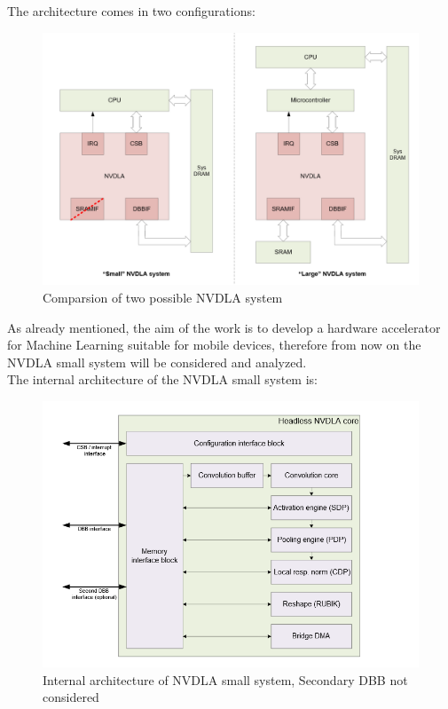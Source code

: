 The architecture comes in two configurations:

\begin{figure}[!htbp]
\centering
\captionsetup{justification=centering}
\includegraphics[scale=0.4]{./figure/nvdla_system.PNG}
\caption{Comparsion of two possible NVDLA system\cite{WEBSITE:8}}
\label{fig:nvdlasystem}
\end{figure}
As already mentioned, the aim of the work is to develop a hardware accelerator for Machine Learning suitable for mobile devices, therefore from now on the NVDLA small system will be considered and analyzed.\\
The internal architecture of the NVDLA small system is:
\begin{figure}[!htbp]
\centering
\captionsetup{justification=centering}
\includegraphics[scale=0.5]{./figure/nvdla_internal.PNG}
\centering\caption{Internal architecture of NVDLA small system, Secondary DBB not considered\cite{WEBSITE:8}}
\label{fig:nvdlaarch}
\end{figure}

